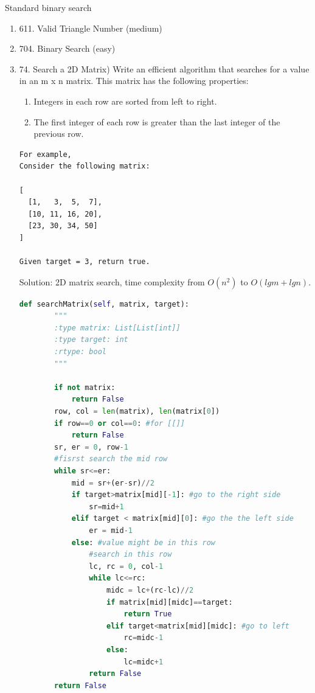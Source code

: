 \documentclass[../searching.tex]{subfiles}
\begin{document}
Standard binary search
\begin{enumerate}
    \item 611. Valid Triangle Number (medium)
    \item 704. Binary Search (easy)
    
\item  74. Search a 2D Matrix) Write an efficient algorithm that searches for a value in an m x n matrix. This matrix has the following properties:
\begin{enumerate}
    \item Integers in each row are sorted from left to right.
    \item The first integer of each row is greater than the last integer of the previous row.
    \end{enumerate}
\begin{lstlisting}[numbers=none]
For example,
Consider the following matrix:

[
  [1,   3,  5,  7],
  [10, 11, 16, 20],
  [23, 30, 34, 50]
]

Given target = 3, return true.
\end{lstlisting}

Solution: 2D matrix search, time complexity from $O(n^2)$ to $O(lgm+lgn)$.
\begin{lstlisting}[language = Python]
def searchMatrix(self, matrix, target):
        """
        :type matrix: List[List[int]]
        :type target: int
        :rtype: bool
        """
        
        if not matrix:
            return False
        row, col = len(matrix), len(matrix[0])
        if row==0 or col==0: #for [[]]
            return False
        sr, er = 0, row-1
        #fisrst search the mid row
        while sr<=er:
            mid = sr+(er-sr)//2
            if target>matrix[mid][-1]: #go to the right side
                sr=mid+1
            elif target < matrix[mid][0]: #go the the left side
                er = mid-1
            else: #value might be in this row
                #search in this row
                lc, rc = 0, col-1
                while lc<=rc:
                    midc = lc+(rc-lc)//2
                    if matrix[mid][midc]==target:
                        return True
                    elif target<matrix[mid][midc]: #go to left
                        rc=midc-1
                    else:
                        lc=midc+1
                return False
        return False
\end{lstlisting}


\end{enumerate}
\end{document}
